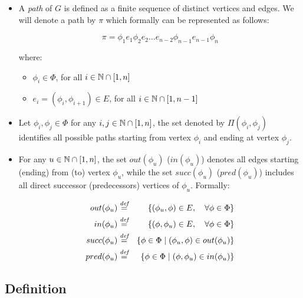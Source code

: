 \begin{itemize}
	\item A \textit{path} of $G$ is defined as a finite sequence of distinct vertices and edges. We will denote a path by $\pi$ which formally can be represented as follows:
	
	\begin{equation}
		\pi = \phi_1 e_1 \phi_2 e_2 \ldots e_{n-2}\phi_{n-1} e_{n-1} \phi_n
	\end{equation}
	
	where:
	
	\begin{itemize}
		\item $\phi_i \in \Phi$, for all $i \in \mathbb{N} \cap \left[ 1, n \right]$
		\item $e_i = \left( \phi_i, \phi_{i+1} \right) \in E$, for all $i \in \mathbb{N} \cap \left[ 1, n-1 \right]$
	\end{itemize}

	\item Let $\phi_i,\phi_j \in \Phi$ for any $i,j \in \mathbb{N} \cap \left[ 1, n \right]$, the set denoted by $\Pi(\phi_i, \phi_j)$ identifies all possible paths starting from vertex $\phi_i$ and ending at vertex $\phi_j$.
		
	\item For any $u \in \mathbb{N} \cap \left[ 1, n \right]$, the set $out(\phi_u)$ ($in(\phi_u)$) denotes all edges starting (ending) from (to) vertex $\phi_u$, while the set $succ(\phi_u)$ ($pred(\phi_u)$) includes all direct successor (predecessors) vertices of $\phi_u$. Formally:
	
	\begin{eqnarray}\label{outDef}
		out(\phi_u) & \overset{\textit{def}}{=} & \left\lbrace (\phi_u, \phi) \in E, \quad \forall \phi \in \Phi  \right\rbrace \\
		in(\phi_u) & \overset{\textit{def}}{=} & \left\lbrace (\phi, \phi_u) \in E, \quad \forall \phi \in \Phi  \right\rbrace \\
		succ(\phi_u) & \overset{\textit{def}}{=} & \left\lbrace \phi \in \Phi \mid (\phi_u, \phi) \in out(\phi_u)  \right\rbrace \\
		pred(\phi_u) & \overset{\textit{def}}{=} & \left\lbrace \phi \in \Phi \mid (\phi, \phi_u) \in in(\phi_u)  \right\rbrace 
	\end{eqnarray}


\end{itemize}

\subsection{Definition}

